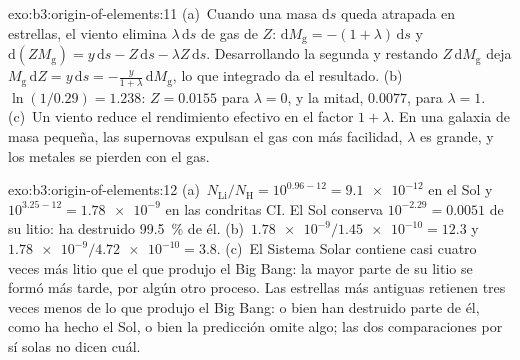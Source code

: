 \begin{solution}{exo:b3:origin-of-elements:11}
(a)~Cuando una masa $\mathrm{d}s$ queda atrapada en estrellas, el viento elimina
$\lambda\,\mathrm{d}s$ de gas de  $Z$:
$\mathrm{d}M_\mathrm{g} = -(1 + \lambda)\,\mathrm{d}s$ y
$\mathrm{d}(ZM_\mathrm{g}) = y\,\mathrm{d}s - Z\,\mathrm{d}s -
\lambda Z\,\mathrm{d}s$. Desarrollando la segunda y restando
$Z\,\mathrm{d}M_\mathrm{g}$ deja $M_\mathrm{g}\,\mathrm{d}Z =
y\,\mathrm{d}s = -\frac{y}{1 + \lambda}\,\mathrm{d}M_\mathrm{g}$, lo que
integrado da el resultado. (b)~$\ln(1/0.29) = 1.238$: $Z = 0.0155$ para
$\lambda = 0$, y la mitad, $0.0077$, para $\lambda = 1$. (c)~Un viento
reduce el rendimiento efectivo en el factor $1 + \lambda$. En una galaxia de
masa pequeña, las supernovas expulsan el gas con más facilidad, $\lambda$ es grande,
y los metales se pierden con el gas.
\end{solution}

\begin{solution}{exo:b3:origin-of-elements:12}
(a)~$N_\mathrm{Li}/N_\mathrm{H} = 10^{0.96 - 12} = \num{9.1e-12}$ en el
Sol y $10^{3.25 - 12} = \num{1.78e-9}$ en las condritas CI. El Sol
conserva $10^{-2.29} = \num{0.0051}$ de su litio: ha destruido
\qty{99.5}{\percent} de él. (b)~$\num{1.78e-9}/\num{1.45e-10} = 12.3$ y
$\num{1.78e-9}/\num{4.72e-10} = 3.8$. (c)~El Sistema Solar contiene casi
cuatro veces más litio que el que produjo el Big Bang: la mayor parte de su litio se
formó más tarde, por algún otro proceso. Las estrellas más antiguas retienen tres veces
menos de lo que produjo el Big Bang: o bien han destruido parte de él, como
ha hecho el Sol, o bien la predicción omite algo; las dos comparaciones
por sí solas no dicen cuál.
\end{solution}

